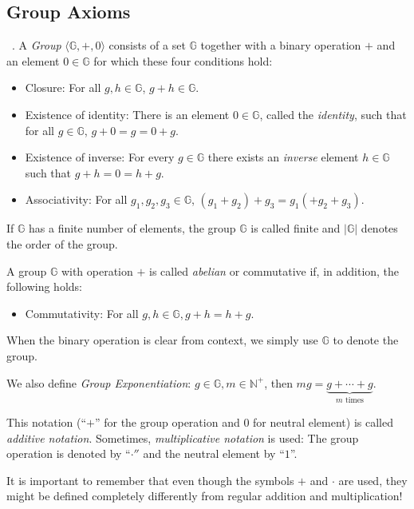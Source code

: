 \subsection{Group Axioms}\label{sec:group}
\begin{definition}~\cite{katz_introduction_2015}. A \emph{Group} $\langle \mathbb{G}, +, 0 \rangle$ consists of a set $\mathbb{G}$ together with a binary operation $+$ and an element $0 \in \mathbb{G}$ for which these four conditions hold:
    \begin{itemize}
        \item Closure: For all $g, h \in \mathbb{G}$, $g + h \in \mathbb{G}$.
        \item Existence of identity: There is an element $0 \in \mathbb{G}$, called the \emph{identity}, such that for all $g \in \mathbb{G}$, $g + 0 = g = 0 + g$.
        \item Existence of inverse: For every $g \in \mathbb{G}$ there exists an \emph{inverse} element $h \in \mathbb{G}$ such that $g + h = 0 = h + g$.
        \item Associativity: For all $g_1, g_2, g_3 \in \mathbb{G}$, $(g_1 + g_2) + g_3 = g_1 (+ g_2 + g_3)$.
    \end{itemize}
    If $\mathbb{G}$ has a finite number of elements, the group $\mathbb{G}$ is called finite and $|\mathbb{G}|$ denotes the order of the group.

    A group $\mathbb{G}$ with operation $+$ is called \emph{abelian} or commutative if, in addition, the following holds:
    \begin{itemize}
        \item Commutativity: For all $g, h \in \mathbb{G}, g + h = h + g$.
    \end{itemize}

    When the binary operation is clear from context, we simply use $\mathbb{G}$ to denote the group.

    We also define \emph{Group Exponentiation}: $g \in \mathbb{G}, m \in \mathbb{N}^+$, then $mg = \underbrace{g + \cdots + g}_{m \text{ times}}$.
\end{definition}


This notation (``$+$'' for the group operation and $0$ for neutral element) is called \emph{additive notation}.
Sometimes, \emph{multiplicative notation} is used: The group operation is denoted by ``$\cdot''$ and the neutral element by ``$1$''.

It is important to remember that even though the symbols $+$ and $\cdot$ are used, they might be defined completely differently from regular addition and multiplication!

